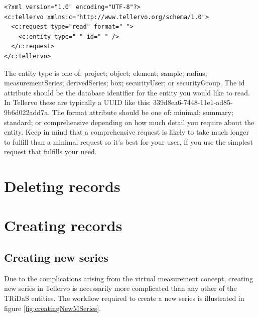\begin{lstlisting}
<?xml version="1.0" encoding="UTF-8"?>
<c:tellervo xmlns:c="http://www.tellervo.org/schema/1.0">
  <c:request type="read" format=" ">
    <c:entity type=" " id=" " />
  </c:request>
</c:tellervo>
\end{lstlisting}

The entity type is one of: project; object; element; sample; radius; measurementSeries; derivedSeries; box; securityUser; or securityGroup.  The id attribute should be the database identifier for the entity you would like to read.  In Tellervo these are typically a UUID like this: 339d8ea6-7448-11e1-ad85-9b6d022add7a.  The format attribute should be one of: minimal; summary; standard; or comprehensive depending on how much detail you require about the entity.  Keep in mind that a comprehensive request is likely to take much longer to fulfill than a minimal request so it's best for your user, if you use the simplest request that fulfills your need.






\section{Deleting records}


\section{Creating records}






\subsection{Creating new series}

Due to the complications arising from the virtual measurement concept, creating new series in Tellervo is necessarily more complicated than any other of the TRiDaS entities.  The workflow required to create a new series is illustrated in figure \ref{fig:creatingNewMSeries}.


